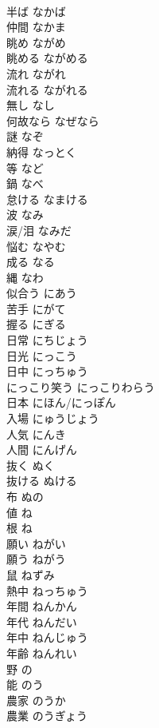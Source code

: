 \documentclass[8pt]{extreport}
\begin{document}
\begin{CJK}{UTF8}{min}
\\	半ば	なかば	
\\	仲間	なかま	
\\	眺め	ながめ	
\\	眺める	ながめる	
\\	流れ	ながれ	
\\	流れる	ながれる	
\\	無し	なし	
\\	何故なら	なぜなら	
\\	謎	なぞ	
\\	納得	なっとく	
\\	等	など	
\\	鍋	なべ	
\\	怠ける	なまける	
\\	波	なみ	
\\	涙/泪	なみだ	
\\	悩む	なやむ	
\\	成る	なる	
\\	縄	なわ	
\\	似合う	にあう	
\\	苦手	にがて	
\\	握る	にぎる	
\\	日常	にちじょう	
\\	日光	にっこう	
\\	日中	にっちゅう	
\\	にっこり笑う	にっこりわらう	
\\	日本	にほん/にっぽん	
\\	入場	にゅうじょう	
\\	人気	にんき	
\\	人間	にんげん	
\\	抜く	ぬく	
\\	抜ける	ぬける	
\\	布	ぬの	
\\	値	ね	
\\	根	ね	
\\	願い	ねがい	
\\	願う	ねがう	
\\	鼠	ねずみ	
\\	熱中	ねっちゅう	
\\	年間	ねんかん	
\\	年代	ねんだい	
\\	年中	ねんじゅう	
\\	年齢	ねんれい	
\\	野	の	
\\	能	のう	
\\	農家	のうか	
\\	農業	のうぎょう	

\end{CJK}
\end{document}
